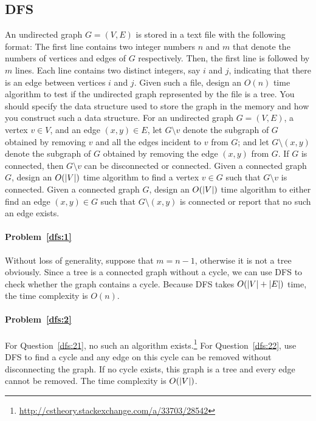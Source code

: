 \subsection{DFS}
\begin{Exercise}

\Question An undirected graph $G = (V, E)$ is stored in a text file with the following format: The first line contains two integer numbers $n$ and $m$ that denote the numbers of vertices and edges of $G$ respectively. Then, the first line is followed by $m$ lines. Each line contains two distinct integers, say $i$ and $j$, indicating that there is an edge between vertices $i$ and $j$. Given such a file, design an $O(n)$ time algorithm to test if the undirected graph represented by the file is a tree. You should specify the data structure used to store the graph in the memory and how you construct such a data structure.   \label{dfs:1}
\Question For an undirected graph $G = (V, E)$, a vertex $v \in V$, and an edge $(x, y) \in E$, let $G\setminus v$ denote the subgraph of $G$ obtained by removing $v$ and all the edges incident to $v$ from $G$; and let $G\setminus(x, y)$ denote the subgraph of $G$ obtained by removing the edge $(x, y)$ from $G$. If $G$ is connected, then $G\setminus v$ can be disconnected or connected. \label{dfs:2}
\subQuestion Given a connected graph $G$, design an $O(\lvert V\rvert)$ time algorithm to find a vertex $v \in G$ such that $G\setminus v$ is connected. \label{dfs:21}
\subQuestion Given a connected graph $G$, design an $O(\lvert V\rvert)$ time algorithm to either find an edge $(x, y) \in G$ such that $G\setminus (x, y)$  is connected or report that no such an edge exists.  \label{dfs:22}
\end{Exercise}
\begin{Answer}

\paragraph{Problem~\ref{dfs:1}}
Without loss of generality, suppose that $m = n-1$, otherwise it is not a tree obviously. Since a tree is a connected graph without a cycle, we can use DFS to check whether the graph contains a cycle. Because DFS takes $O(\lvert V\rvert + \lvert E\rvert)$ time, the time complexity is $O(n)$.

\paragraph{Problem~\ref{dfs:2}}
For Question~\ref{dfs:21}, no such an algorithm exists.\footnote{\url{http://cstheory.stackexchange.com/a/33703/28542}} For Question~\ref{dfs:22}, use DFS to find a cycle and any edge on this cycle can be removed without disconnecting the graph. If no cycle exists, this graph is a tree and every edge cannot be removed. The time complexity is $O(\lvert V\rvert)$.
\end{Answer}


